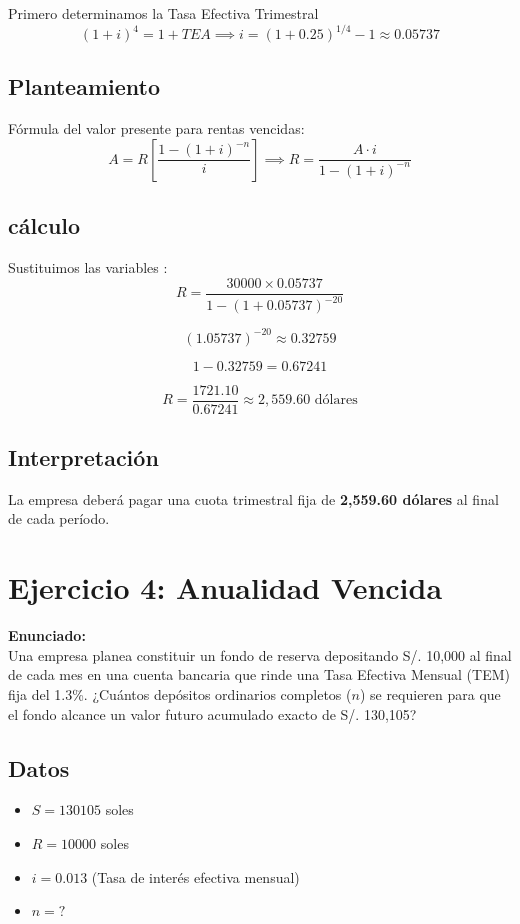 \documentclass[12pt,a4paper]{article}
\begin{document}
	Primero determinamos la Tasa Efectiva Trimestral
	$$(1 + i)^4 = 1 + TEA \implies i = (1 + 0.25)^{1/4} - 1 \approx 0.05737 $$
	
	\subsection*{Planteamiento }
	Fórmula del valor presente para rentas vencidas:
	$$A = R \left[ \frac{1 - (1 + i)^{-n}}{i} \right] \implies R = \frac{A \cdot i}{1 - (1 + i)^{-n}}$$
	
	\subsection*{cálculo}
	Sustituimos las variables :
	$$R = \frac{30000 \times 0.05737}{1 - (1 + 0.05737)^{-20}}$$
	
	$$(1.05737)^{-20} \approx 0.32759$$
	
	$$1 - 0.32759 = 0.67241$$

	$$R = \frac{1721.10}{0.67241} \approx 2,559.60 \text{ dólares}$$
	
	\subsection*{Interpretación}
	La empresa   deberá pagar una cuota trimestral fija de \textbf{2,559.60 dólares} al final de cada período.
	
	\newpage
	
	\section*{Ejercicio 4: Anualidad Vencida}
	
	\textbf{Enunciado:} \\
	Una empresa planea constituir un fondo de reserva depositando S/. 10,000 al final de cada mes en una cuenta bancaria que rinde una Tasa Efectiva Mensual (TEM) fija del 1.3\%. ¿Cuántos depósitos ordinarios completos ($n$) se requieren para que el fondo alcance un valor futuro acumulado exacto de S/. 130,105?
	
	\subsection*{Datos}
	\begin{itemize}
		\item $S = 130105$ soles 
		\item $R = 10000$ soles 
		\item $i = 0.013$ (Tasa de interés efectiva mensual)
		\item $n = \text{?}$
	\end{itemize}
	
\end{document}
